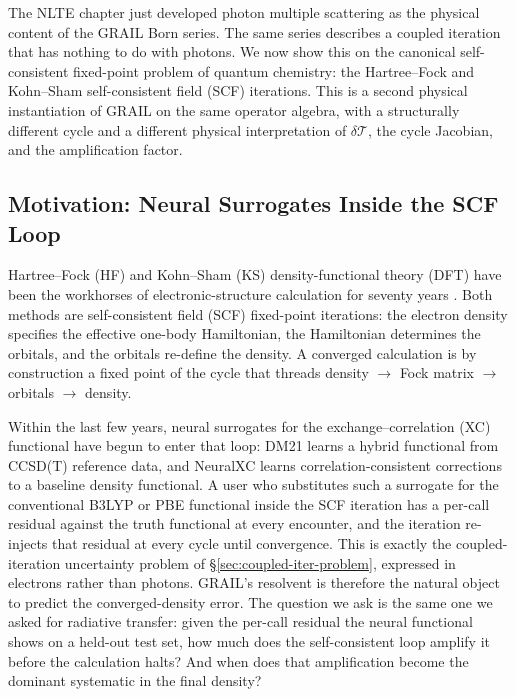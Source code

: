 \documentclass[11pt]{article}
\newcommand{\Tcyc}{\mathcal{T}}
\newcommand{\dT}{\delta\Tcyc}
\begin{document}
The NLTE chapter just developed photon multiple scattering as the
physical content of the GRAIL Born series.  The same series describes
a coupled iteration that has nothing to do with photons.  We now show
this on the canonical self-consistent fixed-point problem of quantum
chemistry: the Hartree--Fock and Kohn--Sham self-consistent field (SCF)
iterations.  This is a second physical instantiation of GRAIL on the
same operator algebra, with a structurally different cycle and a
different physical interpretation of $\dT$, the cycle Jacobian, and
the amplification factor.

\subsection{Motivation: Neural Surrogates Inside the SCF Loop}
\label{sec:scf-motivation}

Hartree--Fock (HF) and Kohn--Sham (KS) density-functional theory
(DFT) have been the workhorses of electronic-structure calculation
for seventy years \citep{SzaboOstlund1996,ParrYang1989}.  Both
methods are self-consistent field (SCF) fixed-point iterations: the
electron density specifies the effective one-body Hamiltonian, the
Hamiltonian determines the orbitals, and the orbitals re-define the
density.  A converged calculation is by construction a fixed point
of the cycle that threads density $\rightarrow$ Fock matrix
$\rightarrow$ orbitals $\rightarrow$ density.

Within the last few years, neural surrogates for the
exchange--correlation (XC) functional have begun to enter that loop:
DM21 \citep{Kirkpatrick2021} learns a hybrid functional from
CCSD(T) reference data, and NeuralXC \citep{DickFernandezSerra2020}
learns correlation-consistent corrections to a baseline
density functional.
A user who substitutes such a surrogate for the conventional
B3LYP or PBE functional inside the SCF iteration has a per-call
residual against the truth functional at every encounter, and the
iteration re-injects that residual at every cycle until convergence.
This is exactly the coupled-iteration uncertainty problem of
\S\ref{sec:coupled-iter-problem}, expressed in electrons rather than
photons.  GRAIL's resolvent is therefore the natural object to
predict the converged-density error.  The question we ask is the same
one we asked for radiative transfer: given the per-call residual the
neural functional shows on a held-out test set, how much does the
self-consistent loop amplify it before the calculation halts?  And
when does that amplification become the dominant systematic in the
final density?
\end{document}
